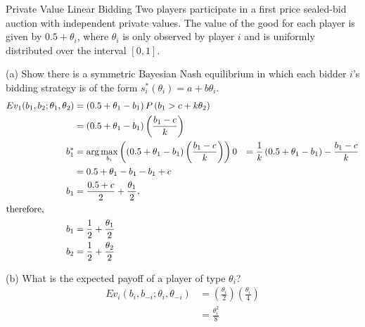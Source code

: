 \documentclass[9pt]{extarticle}
\begin{document}
  \begin{problem}{Private Value Linear Bidding}
    Two players participate in a first price sealed-bid auction with independent private values. The value of the good for each player is given by $0.5 + \theta_i$, where $\theta_i$ is only observed by player $i$ and is uniformly distributed over the interval $[0,1]$.
    \tcblower
    \begin{problem}{(a)}
      Show there is a symmetric Bayesian Nash equilibrium in which each bidder $i$'s bidding strategy is of the form $s_i^*(\theta_i) = a + b\theta_i$.
      \tcblower
      \begin{align*}
        Ev_1(b_1,b_2;\theta_1,\theta_2) &= \left(0.5 + \theta_1 - b_1\right)P\left(b_1 > c + k\theta_{2}\right)\\
                                        &= \left(0.5 + \theta_1 - b_1\right)\left(\frac{b_1 - c}{k}\right)\\
        b_1^* &= \arg\max_{b_i}\left(\left(0.5 + \theta_1 - b_1\right)\left(\frac{b_1 - c}{k}\right)\right)
        0 &= \frac{1}{k}\left(0.5 + \theta_1 - b_1\right) - \frac{b_1-c}{k}\\
          &= 0.5 + \theta_1 - b_1 - b_1 + c\\
        b_1 &= \frac{0.5 + c}{2} + \frac{\theta_1}{2},\\
        \shortintertext{therefore,}
        b_1 &= \frac{1}{2} + \frac{\theta_1}{2}\\
        b_2 &= \frac{1}{2} + \frac{\theta_2}{2}
      \end{align*}
    \end{problem}
    \begin{problem}{(b)}
      What is the expected payoff of a player of type $\theta_i$?
      \tcblower
      \begin{align*}
        Ev_{i}(b_i,b_{-i};\theta_i,\theta_{-i}) &= \left(\frac{\theta_i}{2}\right)\left(\frac{\theta_i}{4}\right)\\
                                                &= \frac{\theta_i^2}{8}
      \end{align*}
    \end{problem}
  \end{problem}
\end{document}
